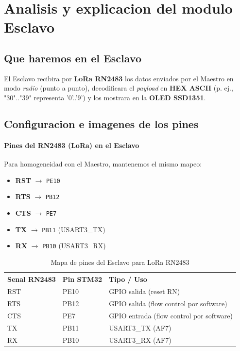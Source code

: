 \documentclass[a4paper,12pt]{article}
\begin{document}
\section{Analisis y explicacion del modulo Esclavo}

\subsection*{Que haremos en el Esclavo}
El Esclavo recibira por \textbf{LoRa RN2483} los datos enviados por el Maestro en modo \textit{radio} (punto a punto), decodificara el \textit{payload} en \textbf{HEX ASCII} (p. ej., "30".."39" representa '0'..'9') y los mostrara en la \textbf{OLED SSD1351}.

\subsection{Configuracion e imagenes de los pines}

\paragraph{Pines del RN2483 (LoRa) en el Esclavo}
Para homogeneidad con el Maestro, mantenemos el mismo mapeo:
\begin{itemize}
    \item \textbf{RST} $\rightarrow$ \texttt{PE10}
    \item \textbf{RTS} $\rightarrow$ \texttt{PB12}
    \item \textbf{CTS} $\rightarrow$ \texttt{PE7}
    \item \textbf{TX}  $\rightarrow$ \texttt{PB11} (USART3\_TX)
    \item \textbf{RX}  $\rightarrow$ \texttt{PB10} (USART3\_RX)
\end{itemize}



\begin{table}[H]
\centering
\caption{Mapa de pines del Esclavo para LoRa RN2483}
\label{tab:pines_esclavo_lora}
\begin{tabular}{lll}
\toprule
\textbf{Senal RN2483} & \textbf{Pin STM32} & \textbf{Tipo / Uso} \\
\midrule
RST  & PE10 & GPIO salida (reset RN) \\
RTS  & PB12 & GPIO salida (flow control por software) \\
CTS  & PE7  & GPIO entrada (flow control por software) \\
TX   & PB11 & USART3\_TX (AF7) \\
RX   & PB10 & USART3\_RX (AF7) \\
\bottomrule
\end{tabular}
\end{table}
\end{document}
